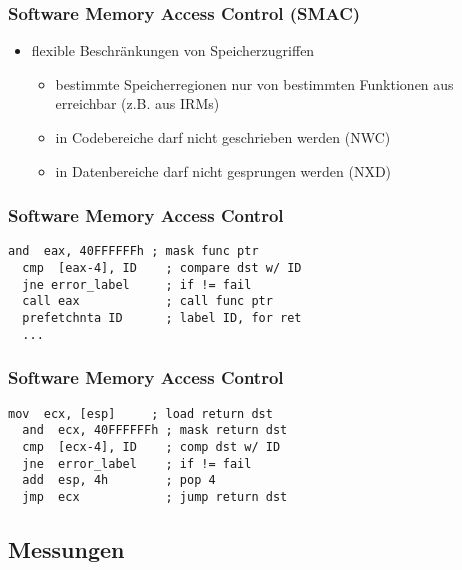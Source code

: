 \documentclass[mathserif,slidestop,compress,red]{beamer}
\begin{document}

\begin{frame}
  \frametitle{Software Memory Access Control (SMAC)}
  \begin{itemize}
    \item flexible Beschränkungen von Speicherzugriffen
    \begin{itemize}
      \item bestimmte Speicherregionen nur von bestimmten Funktionen aus erreichbar (z.B. aus IRMs)
      \item in Codebereiche darf nicht geschrieben werden (NWC)
      \item in Datenbereiche darf nicht gesprungen werden (NXD)

    \end{itemize}
  \end{itemize}
\end{frame}

\begin{frame}[fragile]
  \frametitle{Software Memory Access Control}
  \begin{lstlisting}[title={Call, mit SMAC}]
  and  eax, 40FFFFFFh ; mask func ptr
  cmp  [eax-4], ID    ; compare dst w/ ID
  jne error_label     ; if != fail
  call eax            ; call func ptr
  prefetchnta ID      ; label ID, for ret
  ...
  \end{lstlisting}
\end{frame}

\begin{frame}[fragile]
  \frametitle{Software Memory Access Control}
  \begin{lstlisting}[title={Return, mit SMAC}]
  mov  ecx, [esp]     ; load return dst
  and  ecx, 40FFFFFFh ; mask return dst
  cmp  [ecx-4], ID    ; comp dst w/ ID
  jne  error_label    ; if != fail
  add  esp, 4h        ; pop 4
  jmp  ecx            ; jump return dst
  \end{lstlisting}
\end{frame}

\subsection{Messungen}
\end{document}
